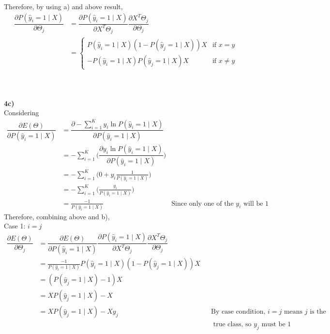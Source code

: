 \documentclass[12pt]{article}
\begin{document}
Therefore, by using a) and above result,\\
\begin{align*}
\dfrac{\partial P(\hat{y}_{i} = 1\mid X)}{\partial \Theta_{j}} &= \dfrac{\partial P(\hat{y}_{i} = 1\mid X)}{\partial X^{T}\Theta_{j}} \dfrac{\partial X^{T}\Theta_{j}}{\partial \Theta_{j}}\\
&= \begin{cases} P(\hat{y}_{i} = 1\mid X)(1 -  P(\hat{y}_{j} = 1\mid X))X &\text{if } x = y\\- P(\hat{y}_{i} = 1\mid X) P(\hat{y}_{j} = 1\mid X)X &\text{if } x \neq y \end{cases}
\end{align*}\paragraph{\\}
\textbf{4c)}\\
Considering
\begin{align*}
\dfrac{\partial E(\Theta)}{\partial P(\hat{y}_{i} = 1 \mid X)} &= \dfrac{\partial -\sum^{K}_{i=1}y_{i}\ln P(\hat{y}_{i} = 1 \mid X)}{\partial P(\hat{y}_{i} = 1 \mid X)}\\
&= -\sum^{K}_{i=1}\Bigg( \dfrac{\partial y_{i}\ln P(\hat{y}_{i} = 1 \mid X)}{\partial P(\hat{y}_{i} = 1 \mid X)}\Bigg)\\
&= -\sum^{K}_{i=1}\Bigg( 0 + y_{i}\frac{1}{P(\hat{y}_{i} = 1 \mid X)}\Bigg)\\
&= -\sum^{K}_{i=1}\Bigg( \frac{y_{i}}{P(\hat{y}_{i} = 1 \mid X)}\Bigg)\\
&= \frac{-1}{P(\hat{y}_{i} = 1 \mid X)} &\text{Since only one of the } y_{i} \text{ will be }1
\end{align*}
Therefore, combining above and b),\\[0.1in]
Case 1: $i = j$
\begin{align*}
\dfrac{\partial E(\Theta)}{\partial\Theta_{j}} &= \dfrac{\partial E(\Theta)}{\partial P(\hat{y}_{i} = 1 \mid X)} \dfrac{\partial P(\hat{y}_{i} = 1\mid X)}{\partial X^{T}\Theta_{j}} \dfrac{\partial X^{T}\Theta_{j}}{\partial \Theta_{j}}\\
&= \frac{-1}{P(\hat{y}_{i} = 1 \mid X)} P(\hat{y}_{i} = 1\mid X)(1 -  P(\hat{y}_{j} = 1\mid X))X\\
&= (P(\hat{y}_{j} = 1\mid X) - 1)X\\
&= XP(\hat{y}_{j} = 1\mid X) - X\\
&= XP(\hat{y}_{j} = 1\mid X) - Xy_{j} &&\text{By case condition, } i = j \text{ means } j \text{ is the} \\&&& \text{ true class, so } y_{j} \text{ must be 1}\\
\end{align*}
\end{document}
